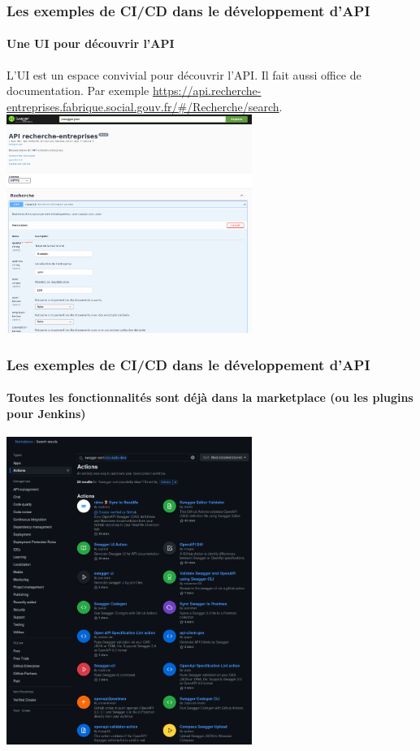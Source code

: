 \documentclass{beamer}
\begin{document}
    \begin{frame}
        \frametitle{Les exemples de CI/CD dans le développement d'API}
        \framesubtitle{Une UI pour découvrir l'API}
        \transdissolve
        L'UI est un espace convivial pour découvrir l'API.
        Il fait aussi office de documentation.
        Par exemple \url{https://api.recherche-entreprises.fabrique.social.gouv.fr/\#/Recherche/search}.
        \bigbreak
        \centering
        \includegraphics[width=8cm]{image/swagger-ui.png}
    \end{frame}

    \begin{frame}
        \frametitle{Les exemples de CI/CD dans le développement d'API}
        \framesubtitle{Toutes les fonctionnalités sont déjà dans la marketplace (ou les plugins pour Jenkins)}
        \transdissolve
        \centering
        \includegraphics[width=8cm]{image/swagger-worflows.png}
    \end{frame}
\end{document}
